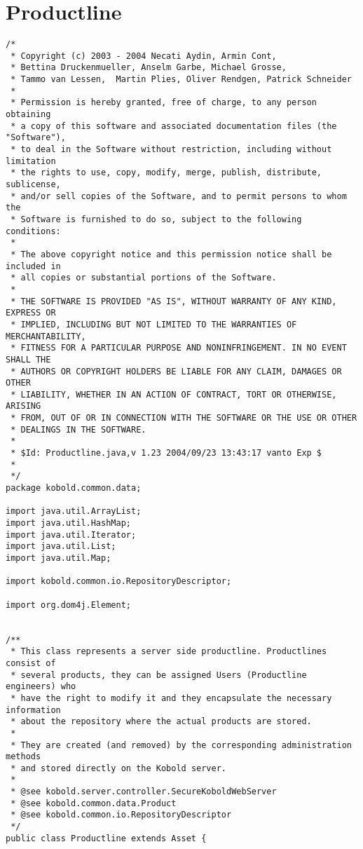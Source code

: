 \section{Productline}
\small \begin{verbatim}
/*
 * Copyright (c) 2003 - 2004 Necati Aydin, Armin Cont, 
 * Bettina Druckenmueller, Anselm Garbe, Michael Grosse, 
 * Tammo van Lessen,  Martin Plies, Oliver Rendgen, Patrick Schneider
 * 
 * Permission is hereby granted, free of charge, to any person obtaining
 * a copy of this software and associated documentation files (the "Software"),
 * to deal in the Software without restriction, including without limitation
 * the rights to use, copy, modify, merge, publish, distribute, sublicense, 
 * and/or sell copies of the Software, and to permit persons to whom the 
 * Software is furnished to do so, subject to the following conditions:
 *
 * The above copyright notice and this permission notice shall be included in 
 * all copies or substantial portions of the Software.
 *
 * THE SOFTWARE IS PROVIDED "AS IS", WITHOUT WARRANTY OF ANY KIND, EXPRESS OR 
 * IMPLIED, INCLUDING BUT NOT LIMITED TO THE WARRANTIES OF MERCHANTABILITY, 
 * FITNESS FOR A PARTICULAR PURPOSE AND NONINFRINGEMENT. IN NO EVENT SHALL THE 
 * AUTHORS OR COPYRIGHT HOLDERS BE LIABLE FOR ANY CLAIM, DAMAGES OR OTHER 
 * LIABILITY, WHETHER IN AN ACTION OF CONTRACT, TORT OR OTHERWISE, ARISING 
 * FROM, OUT OF OR IN CONNECTION WITH THE SOFTWARE OR THE USE OR OTHER 
 * DEALINGS IN THE SOFTWARE.
 *
 * $Id: Productline.java,v 1.23 2004/09/23 13:43:17 vanto Exp $
 *
 */
package kobold.common.data;

import java.util.ArrayList;
import java.util.HashMap;
import java.util.Iterator;
import java.util.List;
import java.util.Map;

import kobold.common.io.RepositoryDescriptor;

import org.dom4j.Element;


/**
 * This class represents a server side productline. Productlines consist of
 * several products, they can be assigned Users (Productline engineers) who
 * have the right to modify it and they encapsulate the necessary information 
 * about the repository where the actual products are stored.
 * 
 * They are created (and removed) by the corresponding administration methods 
 * and stored directly on the Kobold server. 
 * 
 * @see kobold.server.controller.SecureKoboldWebServer
 * @see kobold.common.data.Product
 * @see kobold.common.io.RepositoryDescriptor 
 */
public class Productline extends Asset {


\end{verbatim}
